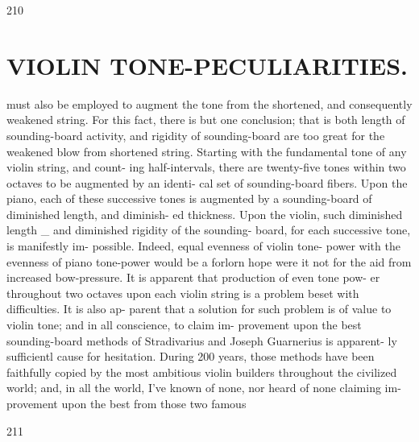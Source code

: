 \documentclass{article}
\begin{document}
210

\section*{VIOLIN TONE-PECULIARITIES.}
must also be employed to augment the tone from the shortened, and consequently weakened string. For this fact, there is but one conclusion; that is both length of sounding-board activity, and rigidity of sounding-board are too great for the weakened blow from shortened string. Starting with the fundamental tone of any violin string, and count- ing half-intervals, there are twenty-five tones within two octaves to be augmented by an identi- cal set of sounding-board fibers. Upon the piano, each of these successive tones is augmented by a sounding-board of diminished length, and diminish- ed thickness. Upon the violin, such diminished length \_ and diminished rigidity of the sounding- board, for each successive tone, is manifestly im- possible. Indeed, equal evenness of violin tone- power with the evenness of piano tone-power would be a forlorn hope were it not for the aid from increased bow-pressure. It is apparent that production of even tone pow- er throughout two octaves upon each violin string is a problem beset with difficulties. It is also ap- parent that a solution for such problem is of value to violin tone; and in all conscience, to claim im- provement upon the best sounding-board methods of Stradivarius and Joseph Guarnerius is apparent- ly sufficientl cause for hesitation. During 200 years, those methods have been faithfully copied by the most ambitious violin builders throughout the civilized world; and, in all the world, I've known of none, nor heard of none claiming im- provement upon the best from those two famous

211
\end{document}
